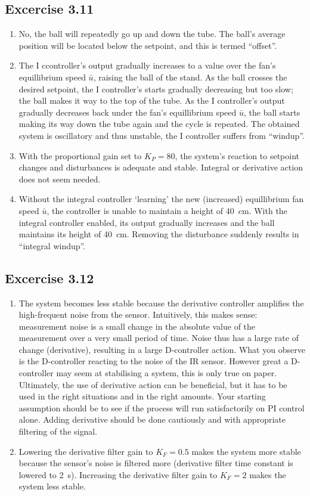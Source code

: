 \documentclass[10pt,twoside,openright]{article}
\begin{document}
\subsection*{Excercise 3.11}

\begin{enumerate}
	\setlength\itemsep{0em}
	\item No, the ball will repeatedly go up and down the tube. The ball's average position will be located below the setpoint, and this is termed ``offset''.
	\item The I ccontroller's output gradually increases to a value over the fan's equillibrium speed $\bar{u}$, raising the ball of the stand. As the ball crosses the desired setpoint, the I controller's starts gradually decreasing but too slow; the ball makes it way to the top of the tube. As the I controller's output gradually decreases back under the fan's equillibrium speed $\bar{u}$, the ball starts making its way down the tube again and the cycle is repeated. The obtained system is oscillatory and thus unstable, the I controller suffers from ``windup''.
	\item With the proportional gain set to $K_P = 80$, the system's reaction to setpoint changes and disturbances is adequate and stable. Integral or derivative action does not seem needed.
	\item Without the integral controller `learning' the new (increased) equillibrium fan speed $\bar{u}$, the controller is unable to maintain a height of 40~cm. With the integral controller enabled, its output gradually increases and the ball maintains its height of 40~cm. Removing the disturbance suddenly results in ``integral windup''. 
\end{enumerate}

\subsection*{Excercise 3.12}
\begin{enumerate}
	\setlength\itemsep{0em}
	\item The system becomes less stable because the derivative controller amplifies the high-frequent noise from the sensor. Intuitively, this makes sense: measurement noise is a small change in the absolute value of the measurement over a very small period of time. Noise thus has a large rate of change (derivative), resulting in a large D-controller action. What you observe is the D-controller reacting to the noise of the IR sensor. However great a D-controller may seem at stabilising a system, this is only true on paper. Ultimately, the use of derivative action can be beneficial, but it has to be used in the right situations and in the right amounts. Your starting assumption should be to see if the process will run satisfactorily on PI control alone. Adding derivative should be done cautiously and with appropriate filtering of the signal.  
	\item Lowering the derivative filter gain to $K_F = 0.5$ makes the system more stable because the sensor's noise is filtered more (derivative filter time constant is lowered to 2~s). Increasing the derivative filter gain to $K_F = 2$ makes the system less stable.
\end{enumerate}
\end{document}
